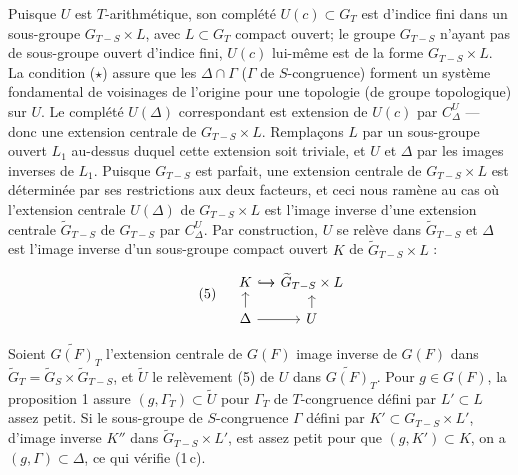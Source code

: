 \documentclass[11pt]{amsart}
\theoremstyle{plain}
\theoremstyle{definition}
\begin{document}
Puisque $U$ est $T$-arithm\'etique, son compl\'et\'e $U(c)\subset G_T$ est d'indice fini dans un sous-groupe $G_{T-S}\times L$, avec $L\subset G_T$ compact ouvert; le groupe $G_{T-S}$ n'ayant pas de sous-groupe ouvert d'indice fini, $U(c)$ lui-m\^eme est de la forme $G_{T-S}\times L$. La condition ($\star$) assure que les $\Delta\cap\Gamma$ ($\Gamma$ de $S$-congruence) forment un syst\`eme fondamental de voisinages de l'origine pour une topologie (de groupe topologique) sur $U$. Le compl\'et\'e $U(\Delta)$ correspondant est extension de $U(c)$ par $C^U_\Delta$ --- donc une extension centrale de $G_{T-S}\times L$. Rempla\c{c}ons $L$ par un sous-groupe ouvert $L_1$ au-dessus duquel cette extension soit triviale, et $U$ et $\Delta$ par les images inverses de $L_1$. Puisque $G_{T-S}$ est parfait, une extension centrale de $G_{T-S}\times L$ est d\'etermin\'ee par ses restrictions aux deux facteurs, et ceci nous ram\`ene au cas o\`u l'extension centrale $U(\Delta)$ de $G_{T-S}\times L$ est l'image inverse d'une extension centrale $\widetilde{G}_{T-S}$ de $G_{T-S}$ par $C^U_\Delta$. Par construction, $U$ se rel\`eve dans $\widetilde{G}_{T-S}$ et $\Delta$ est l'image inverse d'un sous-groupe compact ouvert $K$ de $\widetilde{G}_{T-S}\times L$ :
\begin{equation}\tag{5}
\begin{tikzcd}[column sep=small, row sep=small]
& K \arrow[r] \arrow[r, hook] & \widetilde{G}_{T-S}\times L \\
& \Delta \arrow[u] \arrow[r] & U \arrow[u]
\end{tikzcd}
\end{equation}

Soient $\widetilde{G(F)}_T$ l'extension centrale de $G(F)$ image inverse de $G(F)$ dans $\widetilde{G}_T=\widetilde{G}_S\times\widetilde{G}_{T-S}$, et $\widetilde{U}$ le rel\`evement (5) de $U$ dans $\widetilde{G(F)}_T$. Pour $g\in G(F)$, la proposition 1 assure $(g,\Gamma_T)\subset\widetilde{U}$ pour $\Gamma_T$ de $T$-congruence d\'efini par $L'\subset L$ assez petit. Si le sous-groupe de $S$-congruence $\Gamma$ d\'efini par $K'\subset G_{T-S}\times L'$, d'image inverse $K''$ dans $\widetilde{G}_{T-S}\times L'$, est assez petit pour que $(g,K')\subset K$, on a $(g,\Gamma)\subset\Delta$, ce qui v\'erifie (1\,c).
\end{document}
